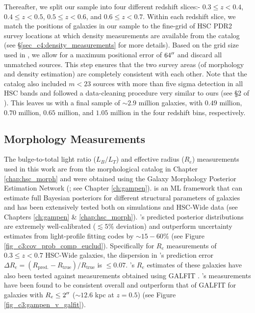 Thereafter, we split our sample into four different redshift slices:- $0.3 \leq z < 0.4$, $0.4 \leq z < 0.5$, $0.5 \leq z < 0.6$, and $0.6 \leq z < 0.7$. Within each redshift slice, we match the positions of galaxies in our sample to the fine-grid of HSC PDR2 survey locations at which density measurements are available from the \citet{hsc_den} catalog (see \S \ref{sec_c4:density_measurements} for more details). Based on the grid size used in \citet{hsc_den}, we allow for a maximum positional error of $64\mbox{$^{\prime\prime}$}$ and discard all unmatched sources. This step ensures that the two survey areas (of morphology and density estimation) are completely consistent with each other. Note that the \citet{hsc_den} catalog also included $m < 23$ sources with more than five sigma detection in all HSC bands and followed a data-cleaning procedure very similar to ours (see \S 2 of \citet{hsc_den}). This leaves us with a final sample of $\sim2.9$ million galaxies, with $0.49$ million, $0.70$ million, $0.65$ million, and $1.05$ million in the four redshift bins, respectively.   

\subsection{Morphology Measurements} \label{sec_c4:morph_measurements}
The bulge-to-total light ratio ($L_B/L_T$) and effective radius ($R_e$) measurements used in this work are from the morphological catalog in Chapter \ref{chap:hsc_morph} and were obtained using the Galaxy Morphology Posterior Estimation Network (\gampen{}; see Chapter \ref{ch:gampen}). \gampen{} is an ML framework that can estimate full Bayesian posteriors for different structural parameters of galaxies and has been extensively tested both on simulations and HSC-Wide data (see Chapters \ref{ch:gampen} \& \ref{chap:hsc_morph}). \gampen{}'s predicted posterior distributions are extremely well-calibrated ($\lesssim 5\%$ deviation) and outperform uncertainty estimates from light-profile fitting codes by $\sim15-60\%$ (see Figure \ref{fig_c3:cov_prob_comp_euclud}). Specifically for $R_e$ measurements of $0.3 \leq z <0.7$ HSC-Wide galaxies, the dispersion in \gampen{}'s prediction error $\Delta R_e=\left(R_{\text {pred.}}-R_{\text {true}}\right) /R_{\text {true}}$ is $\leq0.07$. \gampen{}'s $R_e$ estimates of these galaxies have also been tested against measurements obtained using GALFIT \citep{galfit}. \gampen{}'s measurements have been found to be consistent overall and outperform that of GALFIT for galaxies with $R_e \leq 2\mbox{$^{\prime\prime}$}$ ($\sim 12.6$ kpc at $z=0.5$) (see Figure \ref{fig_c3:gampen_v_galfit}).

